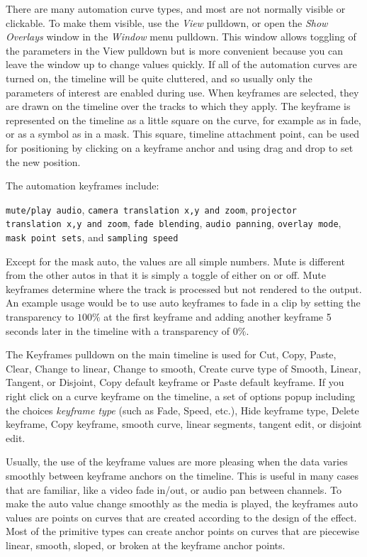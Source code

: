 There are many automation curve types, and most are not normally visible or clickable.  To make them visible, use the \textit{View} pulldown, or open the \textit{Show Overlays} window in the \textit{Window} menu pulldown.   This window allows toggling of the parameters in the View pulldown but is more convenient because you can leave the window up to change values quickly.  If all of the automation curves are turned on, the timeline will be quite cluttered, and so usually only the parameters of interest are enabled during use.  When keyframes are selected, they are drawn on the timeline over the tracks to which they apply.  The keyframe is represented on the timeline as a little square on the curve, for example as in fade, or as a symbol as in a mask.  This square, timeline attachment point, can be used for positioning by clicking on a keyframe anchor and using drag and drop to set the new position.

The automation keyframes include:

\texttt{mute/play audio}, \texttt{camera translation x,y and zoom}, \texttt{projector\\
    translation x,y and zoom}, \texttt{fade blending}, \texttt{audio panning}, \texttt{overlay mode}, \texttt{mask point sets}, and \texttt{sampling speed} 

Except for the mask auto, the values are all simple numbers.  Mute is different from the other autos in that it is simply a toggle of either on or off.  Mute keyframes determine where the track is processed but not rendered to the output.  An example usage would be to use auto keyframes to fade in a clip by setting the transparency to $100\%$ at the first keyframe and adding another keyframe 5 seconds later in the timeline with a transparency of $0\%$.  

The Keyframes pulldown on the main timeline is used for Cut, Copy, Paste, Clear, Change to linear, Change to smooth, Create curve type of Smooth, Linear, Tangent, or Disjoint, Copy default keyframe or Paste default keyframe.  If you right click on a curve keyframe on the timeline, a set of options popup including the choices \textit{keyframe type} (such as Fade, Speed, etc.), Hide keyframe type, Delete keyframe, Copy keyframe, smooth curve, linear segments, tangent edit, or disjoint edit.

Usually, the use of the keyframe values are more pleasing when the data varies smoothly between keyframe anchors on the timeline.  This is useful in many cases that are familiar, like a video fade in/out, or audio pan between channels.  To make the auto value change smoothly as the media is played, the keyframes auto values are points on curves that are created according to the design of the effect.  Most of the primitive types can create anchor points on curves that are piecewise linear, smooth, sloped, or broken at the keyframe anchor points.

